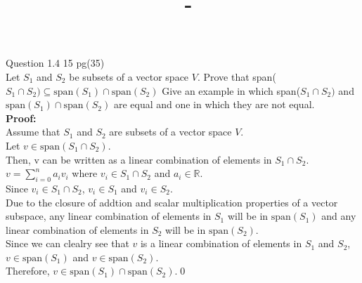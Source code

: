 \documentclass[answers,12pt,addpoints]{exam}
\author{\name}
\title{\course \ - \assignment}
\begin{document}
\maketitle

\begin{questions}
\question Question 1.4 15 pg(35)\\
Let $S_1$ and $S_2$ be subsets of a vector space $V$. Prove that span($S_1 \cap S_2) \subseteq \text{span}(S_1) \cap \text{span}(S_2)$ Give an example in which span($S_1 \cap S_2)$ and $\text{span}(S_1) \cap \text{span}(S_2)$ are equal and one in which they are not equal.\\
\textbf{Proof:}\\
Assume that $S_1$ and $S_2$ are subsets of a vector space $V$.\\
Let $v \in \text{span}(S_1 \cap S_2)$.\\
Then, v can be written as a linear combination of elements in $S_1 \cap S_2$.\\
$v = \sum_{i=0}^{n}a_i v_i$ where $v_i \in S_1 \cap S_2$ and $a_i \in \mathbb{R}$.\\
Since $v_i \in S_1 \cap S_2$, $v_i \in S_1$ and $v_i \in S_2$.\\
Due to the closure of addtion and scalar multiplication properties of a vector subspace, any linear combination of elements in $S_1$ will be in $\text{span}(S_1)$ and any linear combination of elements in $S_2$ will be in $\text{span}(S_2)$.\\
Since we can clealry see that $v$ is a linear combination of elements in $S_1$ and $S_2$, $v \in \text{span}(S_1)$ and $v \in \text{span}(S_2)$.\\
Therefore, $v \in \text{span}(S_1) \cap \text{span}(S_2)$.\qed\\


\end{questions}
\end{document}
